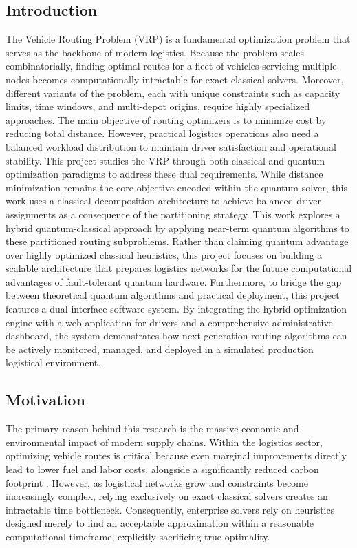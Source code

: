 \documentclass[a4paper]{report}
\begin{document}
{\begin{itemize}
\chapter{Introduction}The Vehicle Routing Problem (VRP) is a fundamental optimization problem that serves as the backbone of modern logistics. Because the problem scales combinatorially, finding optimal routes for a fleet of vehicles servicing multiple nodes becomes computationally intractable for exact classical solvers. Moreover, different variants of the problem, each with unique constraints such as capacity limits, time windows, and multi-depot origins, require highly specialized approaches. The main objective of routing optimizers is to minimize cost by reducing total distance. However, practical logistics operations also need a balanced workload distribution to maintain driver satisfaction and operational stability. This project studies the VRP through both classical and quantum optimization paradigms to address these dual requirements. While distance minimization remains the core objective encoded within the quantum solver, this work uses a classical decomposition architecture to achieve balanced driver assignments as a consequence of the partitioning strategy. This work explores a hybrid quantum-classical approach by applying near-term quantum algorithms to these partitioned routing subproblems. Rather than claiming quantum advantage over highly optimized classical heuristics, this project focuses on building a scalable architecture that prepares logistics networks for the future computational advantages of fault-tolerant quantum hardware. Furthermore, to bridge the gap between theoretical quantum algorithms and practical deployment, this project features a dual-interface software system. By integrating the hybrid optimization engine with a web application for drivers and a comprehensive administrative dashboard, the system demonstrates how next-generation routing algorithms can be actively monitored, managed, and deployed in a simulated production logistical environment.

\section{Motivation}
The primary reason behind this research is the massive economic and environmental impact of modern supply chains. Within the logistics sector, optimizing vehicle routes is critical because even marginal improvements directly lead to lower fuel and labor costs, alongside a significantly reduced carbon footprint \cite{racharla2025quantumvrp}. However, as logistical networks grow and constraints become increasingly complex, relying exclusively on exact classical solvers creates an intractable time bottleneck. Consequently, enterprise solvers rely on heuristics designed merely to find an acceptable approximation within a reasonable computational timeframe, explicitly sacrificing true optimality.


\end{itemize}}
\end{document}
